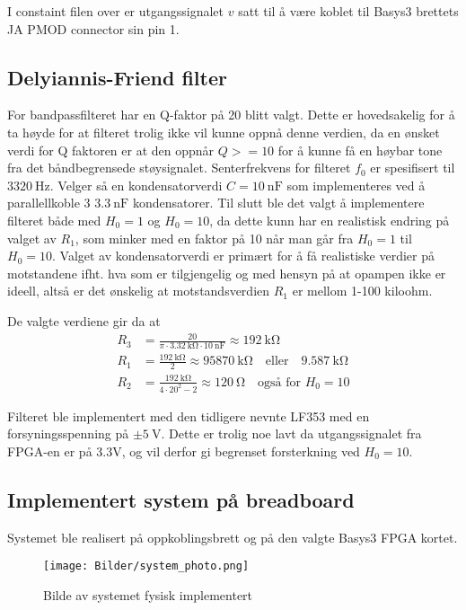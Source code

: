 I constaint filen over er utgangssignalet $v$ satt til å være koblet til Basys3 brettets JA PMOD connector sin pin 1.

\subsection{Delyiannis-Friend filter}
For bandpassfilteret har en Q-faktor på 20 blitt valgt. Dette er hovedsakelig for å ta høyde for at filteret trolig ikke vil kunne oppnå denne verdien, da en ønsket verdi for Q faktoren er at 
den oppnår $Q >= 10$ for å kunne få en høybar tone fra det båndbegrensede støysignalet. Senterfrekvens for filteret $f_0$ er spesifisert til $\SI{3320}{\hertz}$. Velger så en kondensatorverdi
$C = \SI{10}{\nano\farad}$ som implementeres ved å parallellkoble 3 $\SI{3.3}{\nano\farad}$ kondensatorer. Til slutt ble det valgt å implementere filteret både med $H_0 = 1$ og 
$H_0 = 10$, da dette kunn har en realistisk endring på valget av $R_1$, som minker med en faktor på 10 når man går fra $H_0 = 1$ til $H_0 = 10$. Valget av kondensatorverdi er primært for å få realistiske verdier 
på motstandene ifht. hva som er tilgjengelig og med hensyn på at opampen ikke er ideell, altså er det ønskelig at motstandsverdien $R_1$ er mellom 1-100 kiloohm.

De valgte verdiene gir da at
\begin{align*}
    R_3 &= \frac{20}{\pi \cdot \SI{3.32}{\kilo\ohm} \cdot \SI{10}{\nano\farad}} \approx \SI{192}{\kilo\ohm} \\
    R_1 &= \frac{\SI{192}{\kilo\ohm}}{2} \approx \SI{95870}{\kilo\ohm} \:\:\: \text{ eller } \:\:\: \SI{9.587}{\kilo\ohm} \\
    R_2 &= \frac{\SI{192}{\kilo\ohm}}{4 \cdot 20^2 - 2} \approx \SI{120}{\ohm} \:\:\: \text{ også for } H_0 = 10
\end{align*}

Filteret ble implementert med den tidligere nevnte LF353 med en forsyningsspenning på $\pm\SI{5}{\volt}$. Dette er trolig noe 
lavt da utgangssignalet fra FPGA-en er på 3.3V, og vil derfor gi begrenset forsterkning ved $H_0 = 10$.

\subsection{Implementert system på breadboard}
Systemet ble realisert på oppkoblingsbrett og på den valgte Basys3 FPGA kortet.
\begin{figure}[H]
    \centering
    \texttt{[image: Bilder/system\_photo.png]}
    \caption{Bilde av systemet fysisk implementert}
\end{figure}
